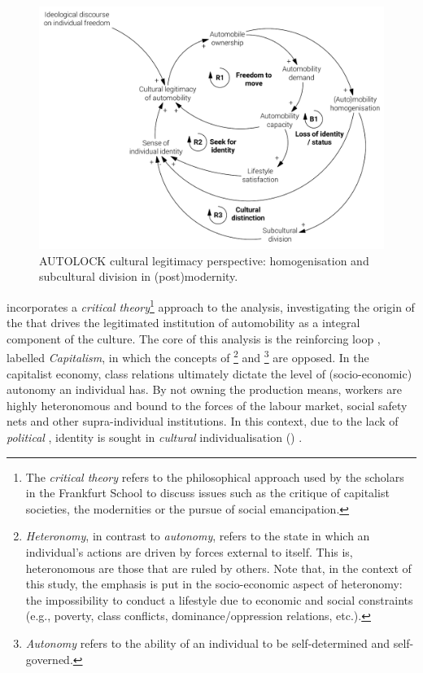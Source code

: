 \begin{figure}[h]
\centering
\includegraphics[width=\textwidth]{figures/model/cropped/cultural_2_subcultures.pdf}
\caption{AUTOLOCK cultural legitimacy perspective: homogenisation and subcultural division in (post)modernity.}
\label{f:results:cld_culture_2}
\end{figure}

 incorporates a \emph{critical theory}\footnote{The \emph{critical theory} refers to the philosophical approach used by the scholars in the Frankfurt School to discuss issues such as the critique of capitalist societies, the modernities or the pursue of social emancipation.} approach to the analysis, investigating the origin of the  that drives the legitimated institution of automobility as a integral component of the culture. The core of this analysis is the reinforcing loop , labelled \emph{Capitalism}, in which the concepts of \footnote{\emph{Heteronomy}, in contrast to \emph{autonomy}, refers to the state in which an individual's actions are driven by forces external to itself. This is, heteronomous are those that are ruled by others. Note that, in the context of this study, the emphasis is put in the socio-economic aspect of heteronomy: the impossibility to conduct a lifestyle due to economic and social constraints (e.g., poverty, class conflicts, dominance/oppression relations, etc.).} and \footnote{\emph{Autonomy} refers to the ability of an individual to be self-determined and self-governed.} are opposed. In the capitalist economy, class relations ultimately dictate the level of (socio-economic) autonomy an individual has. By not owning the production means, workers are highly heteronomous and bound to the forces of the labour market, social safety nets and other supra-individual institutions. In this context, due to the lack of \emph{political} , identity is sought in \emph{cultural} individualisation () \parencite{gartman2004_ThreeAgesAutomobile}.

